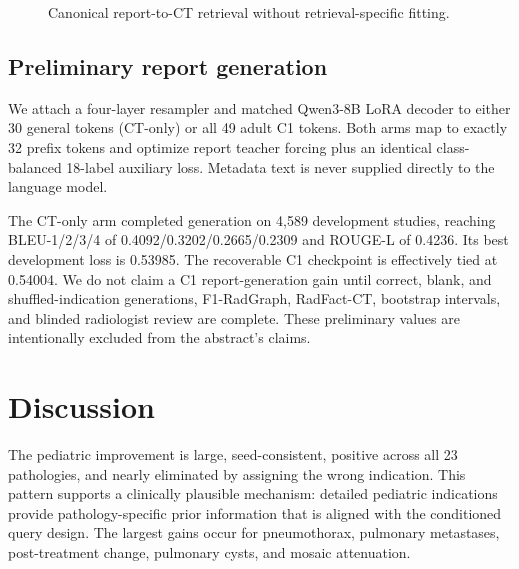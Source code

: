 \documentclass[10pt,twocolumn]{article}
\newcommand{\ours}{\textsc{MetaQ-CT}}
\begin{document}
\begin{figure}[t]
\centering
{}
\caption{Canonical report-to-CT retrieval without retrieval-specific fitting.}
\label{fig:retrieval}
\end{figure}

\subsection{Preliminary report generation}
We attach a four-layer resampler and matched Qwen3-8B LoRA decoder to either
30 general tokens (CT-only) or all 49 adult C1 tokens. Both arms map to exactly
32 prefix tokens and optimize report teacher forcing plus an identical
class-balanced 18-label auxiliary loss. Metadata text is never supplied
directly to the language model.

The CT-only arm completed generation on 4,589 development studies, reaching
BLEU-1/2/3/4 of 0.4092/0.3202/0.2665/0.2309 and ROUGE-L of 0.4236. Its best
development loss is 0.53985. The recoverable C1 checkpoint is effectively tied
at 0.54004. We do not claim a C1 report-generation gain until correct, blank,
and shuffled-indication generations, F1-RadGraph, RadFact-CT, bootstrap
intervals, and blinded radiologist review are complete. These preliminary
values are intentionally excluded from the abstract's claims.

\section{Discussion}
The pediatric improvement is large, seed-consistent, positive across all 23
pathologies, and nearly eliminated by assigning the wrong indication. This
pattern supports a clinically plausible mechanism: detailed pediatric
indications provide pathology-specific prior information that is aligned with
the conditioned query design. The largest gains occur for pneumothorax,
pulmonary metastases, post-treatment change, pulmonary cysts, and mosaic
attenuation.
\end{document}
